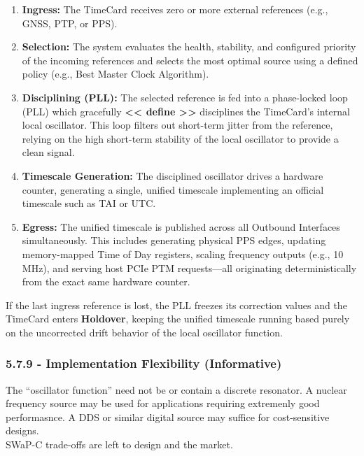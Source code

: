 \begin{enumerate}
\def\labelenumi{\arabic{enumi}.}
\tightlist
\item
  \textbf{Ingress:} The TimeCard receives zero or more external
  references (e.g., GNSS, PTP, or PPS).
\item
  \textbf{Selection:} The system evaluates the health, stability, and
  configured priority of the incoming references and selects the most
  optimal source using a defined policy (e.g., Best Master Clock
  Algorithm).
\item
  \textbf{Disciplining (PLL):} The selected reference is fed into a
  phase-locked loop (PLL) which gracefully \textbf{\textless\textless{}
  define \textgreater\textgreater{}} disciplines the TimeCard's internal
  local oscillator. This loop filters out short-term jitter from the
  reference, relying on the high short-term stability of the local
  oscillator to provide a clean signal.
\item
  \textbf{Timescale Generation:} The disciplined oscillator drives a
  hardware counter, generating a single, unified timescale implementing
  an official timescale such as TAI or UTC.
\item
  \textbf{Egress:} The unified timescale is published across all
  Outbound Interfaces simultaneously. This includes generating physical
  PPS edges, updating memory-mapped Time of Day registers, scaling
  frequency outputs (e.g., 10 MHz), and serving host PCIe PTM
  requests---all originating deterministically from the exact same
  hardware counter.
\end{enumerate}

If the last ingress reference is lost, the PLL freezes its correction
values and the TimeCard enters \textbf{Holdover}, keeping the unified
timescale running based purely on the uncorrected drift behavior of the
local oscillator function.

\subsubsection{5.7.9 - Implementation Flexibility
(Informative)}\label{implementation-flexibility-informative}

The ``oscillator function'' need not be or contain a discrete resonator.
A nuclear frequency source may be used for applications requiring
extremenly good performasnce. A DDS or similar digital source may
suffice for cost-sensitive designs.\\
SWaP-C trade-offs are left to design and the market.


